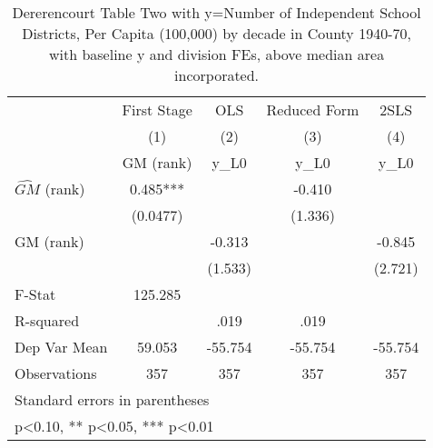 \begin{table}[htbp]\centering
\def\sym#1{\ifmmode^{#1}\else\(^{#1}\)\fi}
\caption{Dererencourt Table Two with y=Number of Independent School Districts, Per Capita (100,000) by decade in County 1940-70, with baseline y and division FEs, above median area incorporated.}
\begin{tabular}{l*{4}{c}}
\toprule
                    & First Stage   &         OLS   &Reduced Form   &        2SLS   \\
                    &\multicolumn{1}{c}{(1)}&\multicolumn{1}{c}{(2)}&\multicolumn{1}{c}{(3)}&\multicolumn{1}{c}{(4)}\\
                    &\multicolumn{1}{c}{GM  (rank)}&\multicolumn{1}{c}{y\_L0}&\multicolumn{1}{c}{y\_L0}&\multicolumn{1}{c}{y\_L0}\\
\midrule
$\hat{GM}$ (rank)   &       0.485***&               &      -0.410   &               \\
                    &    (0.0477)   &               &     (1.336)   &               \\
\addlinespace
GM  (rank)          &               &      -0.313   &               &      -0.845   \\
                    &               &     (1.533)   &               &     (2.721)   \\
\midrule
F-Stat              &     125.285   &               &               &               \\
R-squared           &               &        .019   &        .019   &               \\
Dep Var Mean        &      59.053   &     -55.754   &     -55.754   &     -55.754   \\
Observations        &         357   &         357   &         357   &         357   \\
\bottomrule
\multicolumn{5}{l}{\footnotesize Standard errors in parentheses}\\
\multicolumn{5}{l}{\footnotesize * p<0.10, ** p<0.05, *** p<0.01}\\
\end{tabular}
\end{table}
